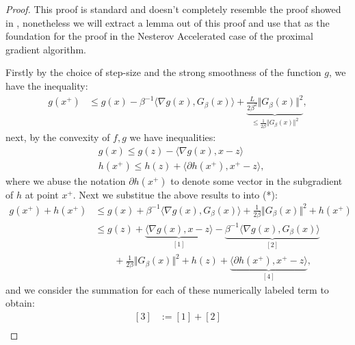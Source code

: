 \documentclass[]{article}
\theoremstyle{definition}
\begin{document}
        \begin{proof}
            This proof is standard and doesn't completely resemble the proof showed in \cite[Aimir, Teboulle]{paper:FISTA}, nonetheless we will extract a lemma out of this proof and use that as the foundation for the proof in the Nesterov Accelerated case of the proximal gradient algorithm.  
            \par
            Firstly by the choice of step-size and the strong smoothness of the function $g$, we have the inequality: 
            \begin{align*}
                g(x^+) 
                & \le 
                g(x) - \beta^{-1}\langle \nabla g(x), G_\beta(x)\rangle + \underbrace{\frac{L}{2\beta^2}\Vert G_\beta(x)\Vert^2}_
                {
                    \le \frac{1}{2\beta}\Vert G_\beta(x)\Vert^2
                }, \tag{*}
            \end{align*}
            next, by the convexity of $f, g$ we have inequalities: 
            \begin{align*}
                & g(x) \le g(z) - \langle \nabla g(x), x - z\rangle
                \\
                & h(x^+)\le h(z) + \langle \partial h(x^+), x^+ - z\rangle, 
            \end{align*}
            where we abuse the notation $\partial h(x^+)$ to denote some vector in the subgradient of $h$ at point $x^+$. Next we substitue the above results to into (*): 
            \begin{align*}
                g(x^+) + h(x^+) 
                & \le 
                g(x) + \beta^{-1}\langle \nabla g(x), G_\beta(x)\rangle + \frac{1}{2\beta}\Vert G_\beta(x)\Vert^2 + h(x^+) 
                \\
                & \le 
                g(z) + 
                \underbrace{\langle \nabla g(x), x - z\rangle }_{[1]}
                - 
                \underbrace{\beta^{-1}\langle \nabla g(x), G_\beta(x)\rangle}_{[2]}
                \\& \quad \quad 
                + 
                \frac{1}{2\beta}\Vert G_\beta(x)\Vert^2 + h(z) + 
                \underbrace{\langle \partial h(x^+), x^+ - z\rangle}_{[4]}, 
                \tag{$\nabla$}
            \end{align*}
            and we consider the summation for each of these numerically labeled term to obtain: 
            \begin{align*}
                {[3]}& := [1] + [2]
                \\

\end{align*}
\end{proof}
\end{document}
